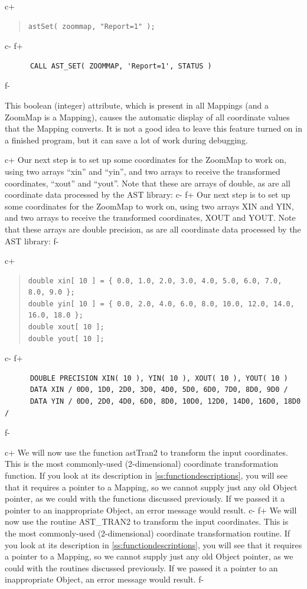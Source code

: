\documentclass[twoside,11pt]{article}
\newcommand{\appref}[1]{Appendix~\ref{#1}}
\renewcommand{\appref}[1]{\ref{#1}}
\begin{document}
c+
\begin{quote}
\small
\begin{verbatim}
astSet( zoommap, "Report=1" );
\end{verbatim}
\normalsize
\end{quote}
c-
f+
\small
\begin{verbatim}
      CALL AST_SET( ZOOMMAP, 'Report=1', STATUS )
\end{verbatim}
\normalsize
f-

This boolean (integer) attribute, which is present in all Mappings
(and a ZoomMap is a Mapping), causes the automatic display of all
coordinate values that the Mapping converts. It is not a good idea to
leave this feature turned on in a finished program, but it can save a
lot of work during debugging.

c+
Our next step is to set up some coordinates for the ZoomMap to work
on, using two arrays ``xin'' and ``yin'', and two arrays to receive
the transformed coordinates, ``xout'' and ``yout''.  Note that these
are arrays of double, as are all coordinate data processed by the AST
library:
c-
f+
Our next step is to set up some coordinates for the ZoomMap to work
on, using two arrays XIN and YIN, and two arrays to receive the
transformed coordinates, XOUT and YOUT.  Note that these arrays are
double precision, as are all coordinate data processed by the AST
library:
f-

c+
\begin{quote}
\small
\begin{verbatim}
double xin[ 10 ] = { 0.0, 1.0, 2.0, 3.0, 4.0, 5.0, 6.0, 7.0, 8.0, 9.0 };
double yin[ 10 ] = { 0.0, 2.0, 4.0, 6.0, 8.0, 10.0, 12.0, 14.0, 16.0, 18.0 };
double xout[ 10 ];
double yout[ 10 ];
\end{verbatim}
\normalsize
\end{quote}
c-
f+
\small
\begin{verbatim}
      DOUBLE PRECISION XIN( 10 ), YIN( 10 ), XOUT( 10 ), YOUT( 10 )
      DATA XIN / 0D0, 1D0, 2D0, 3D0, 4D0, 5D0, 6D0, 7D0, 8D0, 9D0 /
      DATA YIN / 0D0, 2D0, 4D0, 6D0, 8D0, 10D0, 12D0, 14D0, 16D0, 18D0 /
\end{verbatim}
\normalsize
f-

c+
We will now use the function astTran2 to transform the input
coordinates. This is the most commonly-used (2-dimensional) coordinate
transformation function. If you look at its description in
\appref{ss:functiondescriptions}, you will see that it requires a
pointer to a Mapping, so we cannot supply just any old Object pointer,
as we could with the functions discussed previously. If we passed it a
pointer to an inappropriate Object, an error message would result.
c-
f+
We will now use the routine AST\_TRAN2 to transform the input
coordinates. This is the most commonly-used (2-dimensional) coordinate
transformation routine. If you look at its description in
\appref{ss:functiondescriptions}, you will see that it requires a
pointer to a Mapping, so we cannot supply just any old Object pointer,
as we could with the routines discussed previously. If we passed it a
pointer to an inappropriate Object, an error message would result.
f-
\end{document}
